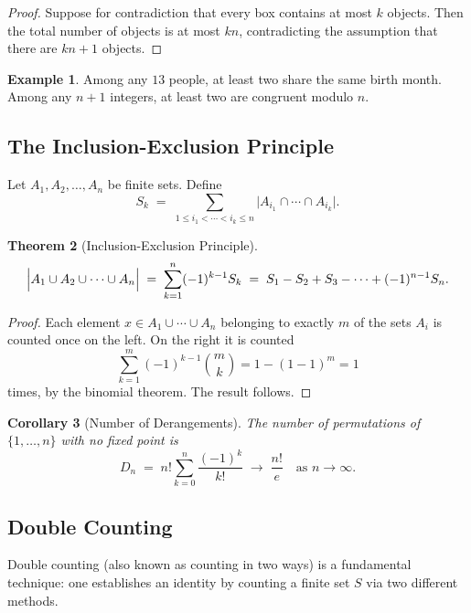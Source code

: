 \documentclass[12pt,a4paper]{amsart}
\newtheorem{theorem}{Theorem}[section]
\newtheorem{corollary}[theorem]{Corollary}
\theoremstyle{definition}
\newtheorem{example}[theorem]{Example}
\theoremstyle{remark}
\begin{document}
\begin{proof}
Suppose for contradiction that every box contains at most $k$ objects.
Then the total number of objects is at most $kn$, contradicting the assumption
that there are $kn+1$ objects.
\end{proof}

\begin{example}
Among any $13$ people, at least two share the same birth month.
Among any $n+1$ integers, at least two are congruent modulo $n$.
\end{example}

\subsection{The Inclusion-Exclusion Principle}

Let $A_1, A_2, \ldots, A_n$ be finite sets.  Define
\[
  S_k \;=\; \sum_{1 \le i_1 < \cdots < i_k \le n} \bigl|A_{i_1} \cap \cdots \cap A_{i_k}\bigr|.
\]

\begin{theorem}[Inclusion-Exclusion Principle]\label{thm:inclusion-exclusion}
\[
  \Bigl|A_1 \cup A_2 \cup \cdots \cup A_n\Bigr|
  \;=\;
  \sum_{k=1}^{n} (-1)^{k-1} S_k
  \;=\;
  S_1 - S_2 + S_3 - \cdots + (-1)^{n-1} S_n.
\]
\end{theorem}

\begin{proof}
Each element $x \in A_1 \cup \cdots \cup A_n$ belonging to exactly $m$ of the
sets $A_i$ is counted once on the left.  On the right it is counted
\[
  \sum_{k=1}^{m}(-1)^{k-1}\binom{m}{k}
  = 1 - (1-1)^m = 1
\]
times, by the binomial theorem.  The result follows.
\end{proof}

\begin{corollary}[Number of Derangements]
The number of permutations of $\{1,\ldots,n\}$ with no fixed point is
\[
  D_n \;=\; n!\sum_{k=0}^{n}\frac{(-1)^k}{k!}
  \;\longrightarrow\; \frac{n!}{e} \quad \text{as } n\to\infty.
\]
\end{corollary}

\subsection{Double Counting}

Double counting (also known as counting in two ways) is a fundamental technique:
one establishes an identity by counting a finite set $S$ via two different methods.
\end{document}
